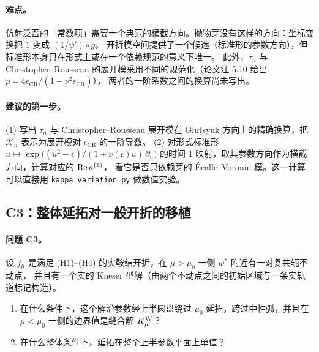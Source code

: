 \paragraph{难点。}仿射泛函的「常数项」需要一个典范的横截方向。抛物芽没有这样的方向：坐标变换把 $1$ 变成 $(1/\psi')\circ\tilde g$。
开折模空间提供了一个候选（标准形的参数方向），但标准形本身只在形式上或在一个依赖规范的意义下唯一。
此外，$\tau_n$ 与 Christopher--Rousseau 的展开模采用不同的规范化（论文注 5.10 给出 $p=4\epsilon_{\mathrm{CR}}/(1-\nu^2\epsilon_{\mathrm{CR}})$），
两者的一阶系数之间的换算尚未写出。

\paragraph{建议的第一步。}(1) 写出 $\tau_n$ 与 Christopher--Rousseau 展开模在 Glutsyuk 方向上的精确换算，把 $\mathcal K_n$ 表示为展开模对 $\epsilon_{\mathrm{CR}}$ 的一阶导数。
(2) 对形式标准形 $u\mapsto\exp\bigl((u^2-\epsilon)/(1+\nu(\epsilon)u)\,\partial_u\bigr)$ 的时间 1 映射，取其参数方向作为横截方向，计算对应的 $\operatorname{Re}\kappa^{(1)}$，
看它是否只依赖芽的 Écalle--Voronin 模。这一计算可以直接用 \texttt{kappa\_variation.py} 做数值实验。

\subsection{C3：整体延拓对一般开折的移植}\label{ch12:sec:C3}

\paragraph{问题 C3。}设 $f_\mu$ 是满足 (H1)--(H4) 的实鞍结开折，在 $\mu>\mu_0$ 一侧 $w^*$ 附近有一对复共轭不动点，
并且有一个实的 Kneser 型解（由两个不动点之间的初始区域与一条实轨道标记构造）。
\begin{enumerate}
\item[(F)] 在什么条件下，这个解沿参数经上半圆盘绕过 $\mu_0$ 延拓，跨过中性弧，并且在 $\mu<\mu_0$ 一侧的边界值是缝合解 $K^{\mathrm W}_\mu$？
\item[(G)] 在什么整体条件下，延拓在整个上半参数平面上单值？
\end{enumerate}

